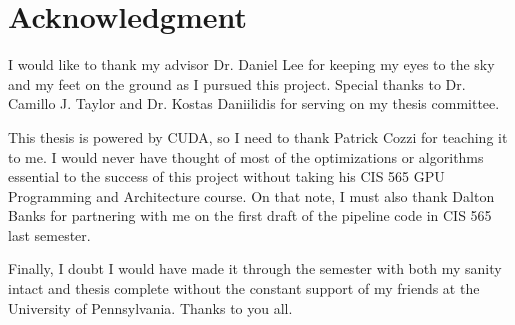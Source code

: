 \chapter*{Acknowledgment}
I would like to thank my advisor Dr. Daniel Lee for keeping my eyes to the sky and my feet on the ground as I pursued this project. Special thanks to Dr. Camillo J. Taylor and Dr. Kostas Daniilidis for serving on my thesis committee. \par 
This thesis is powered by CUDA, so I need to thank Patrick Cozzi for teaching it to me. I would never have thought of most of the optimizations or algorithms essential to the success of this project without taking his CIS 565 GPU Programming and Architecture course. On that note, I must also thank Dalton Banks for partnering with me on the first draft of the pipeline code in CIS 565 last semester.\par 
Finally, I doubt I would have made it through the semester with both my sanity intact and thesis complete without the constant support of my friends at the University of Pennsylvania. Thanks to you all.